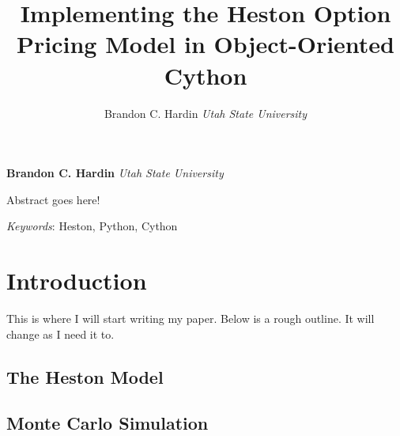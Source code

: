 \documentclass[11pt,]{article}
\title{Implementing the Heston Option Pricing Model in Object-Oriented Cython  }
\author{\Large Brandon C. Hardin\vspace{0.05in} \newline\normalsize\emph{Utah State University}  }
\date{}
\newcommand*{\authorfont}{\fontfamily{phv}\selectfont}
\renewenvironment{abstract}
 {{%
    \setlength{\leftmargin}{0mm}
    \setlength{\rightmargin}{\leftmargin}%
  }%
  \relax}
 {\endlist}
\begin{document}
	
%

{%
\setlength{\parindent}{0pt}
\thispagestyle{plain}
{\fontsize{18}{20}\selectfont\raggedright 
\maketitle  %

}

{
   \vskip 13.5pt\relax \normalsize\fontsize{11}{12} 
\textbf{\authorfont Brandon C. Hardin} \hskip 15pt \emph{\small Utah State University}   

}

}







\begin{abstract}

    \hbox{\vrule height .2pt width 39.14pc}

    \vskip 8.5pt %

\noindent Abstract goes here!


\vskip 8.5pt \noindent \emph{Keywords}: Heston, Python, Cython \par

    \hbox{\vrule height .2pt width 39.14pc}



\end{abstract}


\vskip 6.5pt

\noindent \doublespacing \section{Introduction}\label{introduction}

This is where I will start writing my paper. Below is a rough outline.
It will change as I need it to.

\subsection{The Heston Model}\label{the-heston-model}

\subsection{Monte Carlo Simulation}\label{monte-carlo-simulation}
\end{document}
